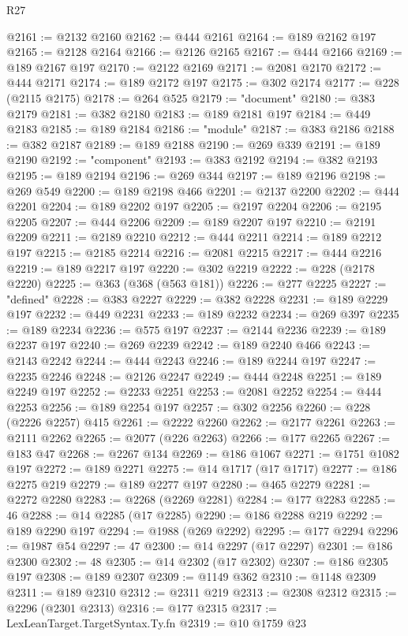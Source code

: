 \begin{lexlean}{R27}
\begin{coremodule}
@2161 := @2132 @2160
@2162 := @444 @2161
@2164 := @189 @2162 @197
@2165 := @2128 @2164
@2166 := @2126 @2165
@2167 := @444 @2166
@2169 := @189 @2167 @197
@2170 := @2122 @2169
@2171 := @2081 @2170
@2172 := @444 @2171
@2174 := @189 @2172 @197
@2175 := @302 @2174
@2177 := @228 (@2115 @2175)
@2178 := @264 @525
@2179 := "document"
@2180 := @383 @2179
@2181 := @382 @2180
@2183 := @189 @2181 @197
@2184 := @449 @2183
@2185 := @189 @2184
@2186 := "module"
@2187 := @383 @2186
@2188 := @382 @2187
@2189 := @189 @2188
@2190 := @269 @339
@2191 := @189 @2190
@2192 := "component"
@2193 := @383 @2192
@2194 := @382 @2193
@2195 := @189 @2194
@2196 := @269 @344
@2197 := @189 @2196
@2198 := @269 @549
@2200 := @189 @2198 @466
@2201 := @2137 @2200
@2202 := @444 @2201
@2204 := @189 @2202 @197
@2205 := @2197 @2204
@2206 := @2195 @2205
@2207 := @444 @2206
@2209 := @189 @2207 @197
@2210 := @2191 @2209
@2211 := @2189 @2210
@2212 := @444 @2211
@2214 := @189 @2212 @197
@2215 := @2185 @2214
@2216 := @2081 @2215
@2217 := @444 @2216
@2219 := @189 @2217 @197
@2220 := @302 @2219
@2222 := @228 (@2178 @2220)
@2225 := @363 (@368 (@563 @181))
@2226 := @277 @2225
@2227 := "defined"
@2228 := @383 @2227
@2229 := @382 @2228
@2231 := @189 @2229 @197
@2232 := @449 @2231
@2233 := @189 @2232
@2234 := @269 @397
@2235 := @189 @2234
@2236 := @575 @197
@2237 := @2144 @2236
@2239 := @189 @2237 @197
@2240 := @269 @2239
@2242 := @189 @2240 @466
@2243 := @2143 @2242
@2244 := @444 @2243
@2246 := @189 @2244 @197
@2247 := @2235 @2246
@2248 := @2126 @2247
@2249 := @444 @2248
@2251 := @189 @2249 @197
@2252 := @2233 @2251
@2253 := @2081 @2252
@2254 := @444 @2253
@2256 := @189 @2254 @197
@2257 := @302 @2256
@2260 := @228 (@2226 @2257) @415
@2261 := @2222 @2260
@2262 := @2177 @2261
@2263 := @2111 @2262
@2265 := @2077 (@226 @2263)
@2266 := @177 @2265
@2267 := @183 @47
@2268 := @2267 @134
@2269 := @186 @1067
@2271 := @1751 @1082 @197
@2272 := @189 @2271
@2275 := @14 @1717 (@17 @1717)
@2277 := @186 @2275 @219
@2279 := @189 @2277 @197
@2280 := @465 @2279
@2281 := @2272 @2280
@2283 := @2268 (@2269 @2281)
@2284 := @177 @2283
@2285 := 46
@2288 := @14 @2285 (@17 @2285)
@2290 := @186 @2288 @219
@2292 := @189 @2290 @197
@2294 := @1988 (@269 @2292)
@2295 := @177 @2294
@2296 := @1987 @54
@2297 := 47
@2300 := @14 @2297 (@17 @2297)
@2301 := @186 @2300
@2302 := 48
@2305 := @14 @2302 (@17 @2302)
@2307 := @186 @2305 @197
@2308 := @189 @2307
@2309 := @1149 @362
@2310 := @1148 @2309
@2311 := @189 @2310
@2312 := @2311 @219
@2313 := @2308 @2312
@2315 := @2296 (@2301 @2313)
@2316 := @177 @2315
@2317 := LexLeanTarget.TargetSyntax.Ty.fn
@2319 := @10 @1759 @23

\end{coremodule}
\end{lexlean}
